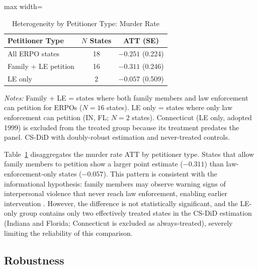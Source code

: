 \documentclass[12pt]{article}
\begin{document}
\begin{table}[H]
\centering
\caption{Heterogeneity by Petitioner Type: Murder Rate}
\label{tab:heterogeneity}
\begin{adjustbox}{max width=\textwidth}
\begin{threeparttable}
\begin{tabular}{lcc}
\toprule
Petitioner Type & $N$ States & ATT (SE) \\
\midrule
All ERPO states & 18 & $-0.251$ (0.224) \\
Family + LE petition & 16 & $-0.311$ (0.246) \\
LE only & 2 & $-0.057$ (0.509) \\
\bottomrule
\end{tabular}
\begin{tablenotes}[flushleft]
\small
\item \textit{Notes:} Family + LE = states where both family members and law enforcement can petition for ERPOs ($N = 16$ states). LE only = states where only law enforcement can petition (IN, FL; $N = 2$ states). Connecticut (LE only, adopted 1999) is excluded from the treated group because its treatment predates the panel. CS-DiD with doubly-robust estimation and never-treated controls.
\end{tablenotes}
\end{threeparttable}
\end{adjustbox}
\end{table}

Table~\ref{tab:heterogeneity} disaggregates the murder rate ATT by petitioner type. States that allow family members to petition show a larger point estimate ($-0.311$) than law-enforcement-only states ($-0.057$). This pattern is consistent with the informational hypothesis: family members may observe warning signs of interpersonal violence that never reach law enforcement, enabling earlier intervention \citep{webster2020erpo, wintemute2019extreme}. However, the difference is not statistically significant, and the LE-only group contains only two effectively treated states in the CS-DiD estimation (Indiana and Florida; Connecticut is excluded as always-treated), severely limiting the reliability of this comparison.


\subsection{Robustness}
\end{document}
